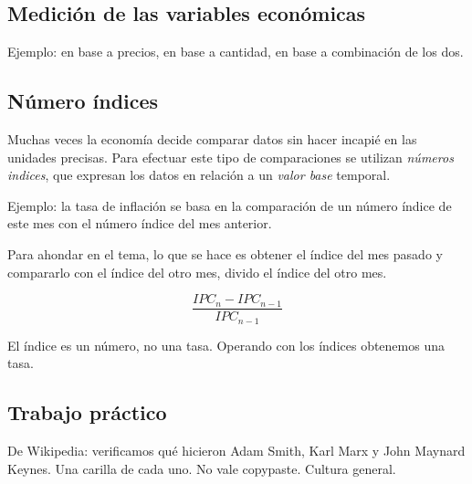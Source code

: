 \subsection{Medición de las variables económicas}

Ejemplo: en base a precios,
en base a cantidad,
en base a combinación de los dos.

\subsection{Número índices}

Muchas veces la economía decide comparar datos sin hacer incapié en las unidades precisas.
Para efectuar este tipo de comparaciones se utilizan \textit{números indices},
que expresan los datos en relación a un \textit{valor base} temporal.

Ejemplo: la tasa de inflación se basa en la comparación de un número índice de este mes con 
el número índice del mes anterior.

Para ahondar en el tema, lo que se hace es 
obtener el índice del mes pasado y compararlo con el índice del otro mes,
divido el índice del otro mes.

\begin{equation*}
    \frac{IPC_{n} - IPC_{n-1}}{IPC_{n-1}}
\end{equation*}

El índice es un número, no una tasa.
Operando con los índices obtenemos una tasa.

\subsection{Trabajo práctico}

De Wikipedia: verificamos qué hicieron Adam Smith, Karl Marx y John Maynard Keynes.
Una carilla de cada uno. No vale copypaste. Cultura general.
